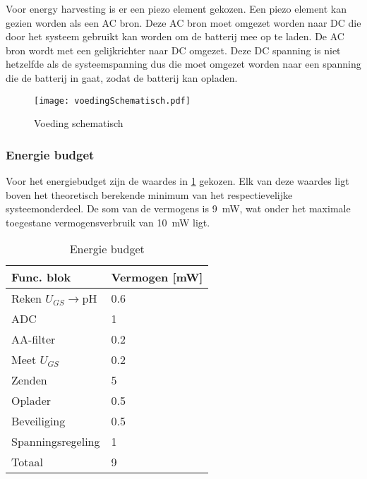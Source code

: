 Voor energy harvesting is er een piezo element gekozen. Een piezo element kan gezien worden als een AC bron. Deze AC bron moet omgezet worden naar DC die door het systeem gebruikt kan worden om de batterij mee op te laden. De AC bron wordt met een gelijkrichter naar DC omgezet. Deze DC spanning is niet hetzelfde als de systeemspanning dus die moet omgezet worden naar een spanning die de batterij in gaat, zodat de batterij kan opladen.

\begin{figure}[!htbp]
    \centering
    \texttt{[image: voedingSchematisch.pdf]}
    \caption{Voeding schematisch}
    \label{fig:voedingSchematisch}
\end{figure}



\subsubsection{Energie budget}\label{sec:energyBudgets}
Voor het energiebudget zijn de waardes in \cref{tab:energieBudgetEstimatie} gekozen. Elk van deze waardes ligt boven het theoretisch berekende minimum van het respectievelijke systeemonderdeel. De som van de vermogens is \qty{9}{\milli\watt}, wat onder het maximale toegestane vermogensverbruik van \qty{10}{\milli\watt} ligt.


\begin{table}[!htbp]
    \centering
    \begin{tabular}{l|l}
        Func. blok          & Vermogen [mW] \\
        \hline
        Reken $U_{GS}\rightarrow$pH & 0.6   \\
        ADC                 & 1             \\
        AA-filter           & 0.2           \\
        Meet $U_{GS}$       & 0.2           \\
        Zenden              & 5             \\
        Oplader             & 0.5           \\
        Beveiliging         & 0.5           \\
        Spanningsregeling   & 1             \\
        \hline
        \hline
        Totaal              & 9

    \end{tabular}
    \caption{Energie budget}
    \label{tab:energieBudgetEstimatie}
\end{table}


